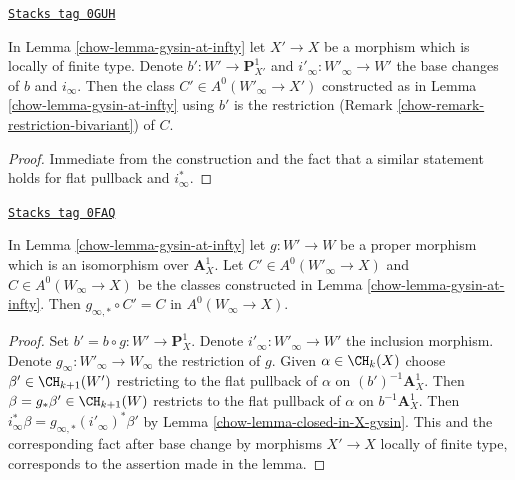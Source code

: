 \begin{lemma}
\label{chow-lemma-base-change-gysin-at-infty}
\href{https://stacks.math.columbia.edu/tag/0GUH}{\texttt{Stacks tag 0GUH}}

In Lemma \ref{chow-lemma-gysin-at-infty} let $X' \to X$ be a morphism
which is locally of finite type. Denote $b' : W' \to \mathbf{P}^1_{X'}$
and $i'_\infty : W'_\infty \to W'$ the base changes of $b$ and $i_\infty$.
Then the class $C' \in A^0(W'_\infty \to X')$ constructed as in
Lemma \ref{chow-lemma-gysin-at-infty} using $b'$ is the restriction
(Remark \ref{chow-remark-restriction-bivariant}) of $C$.
\end{lemma}

\begin{proof}
Immediate from the construction and the fact that a similar
statement holds for flat pullback and $i_\infty^*$.
\end{proof}

\begin{lemma}
\label{chow-lemma-gysin-at-infty-independent}
\href{https://stacks.math.columbia.edu/tag/0FAQ}{\texttt{Stacks tag 0FAQ}}

In Lemma \ref{chow-lemma-gysin-at-infty} let $g : W' \to W$ be a proper morphism
which is an isomorphism over $\mathbf{A}^1_X$. Let
$C' \in A^0(W'_\infty \to X)$ and $C \in A^0(W_\infty \to X)$
be the classes constructed in Lemma \ref{chow-lemma-gysin-at-infty}.
Then $g_{\infty, *} \circ C' = C$ in $A^0(W_\infty \to X)$.
\end{lemma}

\begin{proof}

Set $b' = b \circ g : W' \to \mathbf{P}^1_X$. Denote
$i'_\infty : W'_\infty \to W'$ the inclusion morphism.
Denote $g_\infty : W'_\infty \to W_\infty$ the restriction of $g$.
Given $\alpha \in \CH_k(X)$ choose $\beta' \in \CH_{k + 1}(W')$
restricting to the flat pullback of $\alpha$ on $(b')^{-1}\mathbf{A}^1_X$.
Then $\beta = g_*\beta' \in \CH_{k + 1}(W)$ restricts to the
flat pullback of $\alpha$ on $b^{-1}\mathbf{A}^1_X$.
Then $i_\infty^*\beta = g_{\infty, *}(i'_\infty)^*\beta'$
by Lemma \ref{chow-lemma-closed-in-X-gysin}.
This and the corresponding fact after base change by
morphisms $X' \to X$ locally of finite type, corresponds
to the assertion made in the lemma.
\end{proof}

